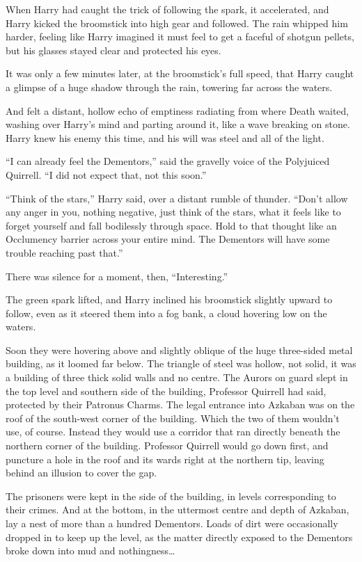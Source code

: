When Harry had caught the trick of following the spark, it accelerated, and Harry kicked the broomstick into high gear and followed. The rain whipped him harder, feeling like Harry imagined it must feel to get a faceful of shotgun pellets, but his glasses stayed clear and protected his eyes.

It was only a few minutes later, at the broomstick’s full speed, that Harry caught a glimpse of a huge shadow through the rain, towering far across the waters.

And felt a distant, hollow echo of emptiness radiating from where Death waited, washing over Harry’s mind and parting around it, like a wave breaking on stone. Harry knew his enemy this time, and his will was steel and all of the light.

“I can already feel the Dementors,” said the gravelly voice of the Polyjuiced Quirrell. “I did not expect that, not this soon.”

“Think of the stars,” Harry said, over a distant rumble of thunder. “Don’t allow any anger in you, nothing negative, just think of the stars, what it feels like to forget yourself and fall bodilessly through space. Hold to that thought like an Occlumency barrier across your entire mind. The Dementors will have some trouble reaching past that.”

There was silence for a moment, then, “Interesting.”

The green spark lifted, and Harry inclined his broomstick slightly upward to follow, even as it steered them into a fog bank, a cloud hovering low on the waters.

Soon they were hovering above and slightly oblique of the huge three-sided metal building, as it loomed far below. The triangle of steel was hollow, not solid, it was a building of three thick solid walls and no centre. The Aurors on guard slept in the top level and southern side of the building, Professor Quirrell had said, protected by their Patronus Charms. The legal entrance into Azkaban was on the roof of the south-west corner of the building. Which the two of them wouldn’t use, of course. Instead they would use a corridor that ran directly beneath the northern corner of the building. Professor Quirrell would go down first, and puncture a hole in the roof and its wards right at the northern tip, leaving behind an illusion to cover the gap.

The prisoners were kept in the side of the building, in levels corresponding to their crimes. And at the bottom, in the uttermost centre and depth of Azkaban, lay a nest of more than a hundred Dementors. Loads of dirt were occasionally dropped in to keep up the level, as the matter directly exposed to the Dementors broke down into mud and nothingness…

